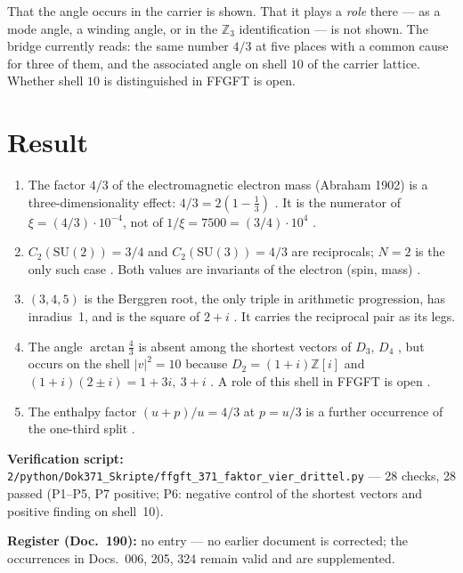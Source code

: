 That the angle occurs in the carrier is shown. That it plays a \emph{role}
there --- as a mode angle, a winding angle, or in the $\mathbb Z_3$
identification --- is not shown. The bridge currently reads: the same number
$4/3$ at five places with a common cause for three of them, and the associated
angle on shell $10$ of the carrier lattice. Whether shell $10$ is distinguished
in FFGFT is open.

\section{Result}

\begin{enumerate}
\item The factor $4/3$ of the electromagnetic electron mass (Abraham 1902) is a
  three-dimensionality effect: $4/3 = 2(1-\tfrac13)$ \EM\BM. It is the
  numerator of $\xi = (4/3)\cdot10^{-4}$, not of $1/\xi=7500=(3/4)\cdot10^4$ \SM.
\item $C_2(\mathrm{SU}(2)) = 3/4$ and $C_2(\mathrm{SU}(3)) = 4/3$ are
  reciprocals; $N=2$ is the only such case \BM. Both values are invariants of
  the electron (spin, mass) \SM.
\item $(3,4,5)$ is the Berggren root, the only triple in arithmetic progression,
  has inradius~1, and is the square of $2+i$ \BM. It carries the reciprocal pair
  as its legs.
\item The angle $\arctan\tfrac43$ is absent among the shortest vectors of
  $D_3$, $D_4$ \XM, but occurs on the shell $|v|^2=10$ because
  $D_2 = (1+i)\mathbb Z[i]$ and $(1+i)(2\pm i) = 1+3i,\ 3+i$ \BM. A role of
  this shell in FFGFT is open \SM.
\item The enthalpy factor $(u+p)/u = 4/3$ at $p = u/3$ is a further occurrence
  of the one-third split \EM.
\end{enumerate}

\medskip
\noindent\textbf{Verification script:} \texttt{2/python/Dok371\_Skripte/ffgft\_371\_faktor\_vier\_drittel.py}
--- 28 checks, 28 passed (P1--P5, P7 positive; P6: negative control of the shortest vectors and positive finding on shell~10).

\medskip
\noindent\textbf{Register (Doc.~190):} no entry --- no earlier document is
corrected; the occurrences in Docs.~006, 205, 324 remain valid and are
supplemented.

